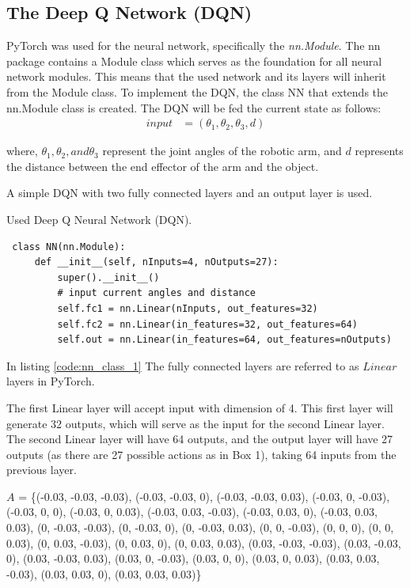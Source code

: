 \documentclass[12pt,oneside]{article}
\begin{document}
\subsection{The Deep Q Network (DQN)}               
PyTorch \cite{pytorch} was used for the neural network, specifically the \textit{nn.Module}. 
The nn package contains a Module class which serves as the foundation for all neural network modules. This means that the used network and its layers will inherit from the Module class. To implement the DQN, the class NN that extends the nn.Module class is created. The DQN will be fed the current state as follows:
\begin{align}
	input &= (\theta_1, \theta_2, \theta_3, d) \label{eq:1}
\end{align}

where, $\theta_1, \theta_2, and \theta_3$ represent the joint angles of the robotic arm, and $d$ represents the distance between the end effector of the arm and the object. 

A simple DQN with two fully connected layers and an output layer is used.
\begin{listing}[htbp]
\caption{Used Deep Q Neural Network (DQN).}
\label{code:nn_class_1}
\begin{verbatim}
 class NN(nn.Module):
     def __init__(self, nInputs=4, nOutputs=27):
         super().__init__()
         # input current angles and distance
         self.fc1 = nn.Linear(nInputs, out_features=32)
         self.fc2 = nn.Linear(in_features=32, out_features=64)
         self.out = nn.Linear(in_features=64, out_features=nOutputs)
\end{verbatim}
\end{listing} 

In listing \ref{code:nn_class_1} The fully connected layers are referred to as $Linear$ layers in PyTorch.

The first Linear layer will accept input with dimension of 4. This first layer will generate 32 outputs, which will serve as the input for the second Linear layer. The second Linear layer will have 64 outputs, and the output layer will have 27 outputs (as there are 27 possible actions as in Box 1), taking 64 inputs from the previous layer.

\begin{tcolorbox}[label=mybox, titlebox=visible, title=Box 1. Possible actions that the agent can take]
$A$ = \{(-0.03, -0.03, -0.03), (-0.03, -0.03, 0), (-0.03, -0.03, 0.03),
 (-0.03, 0, -0.03), (-0.03, 0, 0), (-0.03, 0, 0.03), 
 (-0.03, 0.03, -0.03), (-0.03, 0.03, 0), (-0.03, 0.03, 0.03),
  (0, -0.03, -0.03), (0, -0.03, 0), (0, -0.03, 0.03), 
  (0, 0, -0.03), (0, 0, 0), (0, 0, 0.03), (0, 0.03, -0.03), 
  (0, 0.03, 0), (0, 0.03, 0.03), (0.03, -0.03, -0.03), 
  (0.03, -0.03, 0), (0.03, -0.03, 0.03), (0.03, 0, -0.03), 
  (0.03, 0, 0), (0.03, 0, 0.03), (0.03, 0.03, -0.03), 
  (0.03, 0.03, 0), (0.03, 0.03, 0.03)\}
\end{tcolorbox}
\end{document}
